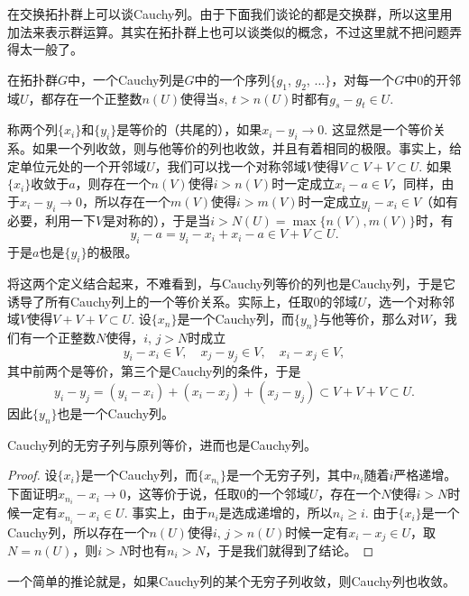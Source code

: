 \begin{para}
在交换拓扑群上可以谈Cauchy列。由于下面我们谈论的都是交换群，所以这里用加法来表示群运算。其实在拓扑群上也可以谈类似的概念，不过这里就不把问题弄得太一般了。

在拓扑群$G$中，一个Cauchy列是$G$中的一个序列$\{g_1$, $g_2$, $\dots\}$，对每一个$G$中$0$的开邻域$U$，都存在一个正整数$n(U)$使得当$s$, $t>n(U)$时都有$g_s-g_t\in U$. 

称两个列$\{x_i\}$和$\{y_i\}$是等价的（共尾的），如果$x_i-y_i\to 0$. 这显然是一个等价关系。如果一个列收敛，则与他等价的列也收敛，并且有着相同的极限。事实上，给定单位元处的一个开邻域$U$，我们可以找一个对称邻域$V$使得$V\subset V+V\subset U$. 如果$\{x_i\}$收敛于$a$，则存在一个$n(V)$使得$i>n(V)$时一定成立$x_i-a\in V$，同样，由于$x_i-y_i\to 0$，所以存在一个$m(V)$使得$i>m(V)$时一定成立$y_i-x_i\in V$（如有必要，利用一下$V$是对称的），于是当$i>N(U)=\max\{n(V),m(V)\}$时，有
\[
	y_i-a=y_i-x_i+x_i-a\in V+V\subset U.
\]
于是$a$也是$\{y_i\}$的极限。

将这两个定义结合起来，不难看到，与Cauchy列等价的列也是Cauchy列，于是它诱导了所有Cauchy列上的一个等价关系。实际上，任取$0$的邻域$U$，选一个对称邻域$V$使得$V+V+V\subset U$. 设$\{x_n\}$是一个Cauchy列，而$\{y_n\}$与他等价，那么对$W$，我们有一个正整数$N$使得，$i$, $j>N$时成立
\[
	y_i-x_i\in V,\quad x_j-y_j\in V,\quad x_i-x_j\in V,
\]
其中前两个是等价，第三个是Cauchy列的条件，于是
\[
	y_i-y_j=(y_i-x_i)+(x_i-x_j)+(x_j-y_j)\subset V+V+V\subset U.
\]
因此$\{y_n\}$也是一个Cauchy列。

\end{para}

\begin{lem}
	Cauchy列的无穷子列与原列等价，进而也是Cauchy列。
\end{lem}

\begin{proof}
	设$\{x_i\}$是一个Cauchy列，而$\{x_{n_i}\}$是一个无穷子列，其中$n_i$随着$i$严格递增。下面证明$x_{n_i}-x_i\to 0$，这等价于说，任取$0$的一个邻域$U$，存在一个$N$使得$i>N$时候一定有$x_{n_i}-x_{i}\in U$. 事实上，由于$n_i$是选成递增的，所以$n_i\geq i$. 由于$\{x_i\}$是一个Cauchy列，所以存在一个$n(U)$使得$i$, $j>n(U)$时候一定有$x_i-x_j\in U$，取$N=n(U)$，则$i>N$时也有$n_i>N$，于是我们就得到了结论。
\end{proof}

一个简单的推论就是，如果Cauchy列的某个无穷子列收敛，则Cauchy列也收敛。

